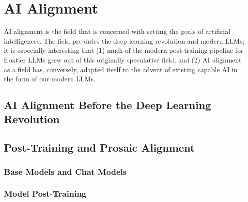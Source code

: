 \chapter{AI Alignment}\label{ch_ai_alignment}

AI alignment is the field that is concerned with setting the goals of
artificial intelligences. The field pre-dates the deep learning revolution and
modern LLMs; it is especially interesting that (1) much of the modern
post-training pipeline for frontier LLMs grew out of this originally
speculative field, and (2) AI alignment as a field has, conversely, adapted
itself to the advent of existing capable AI in the form of our modern LLMs.

\section{AI Alignment Before the Deep Learning Revolution}
\cite{bostrom2014superintelligence}

\section{Post-Training and Prosaic Alignment}

\subsection{Base Models and Chat Models}

\subsection{Model Post-Training}


